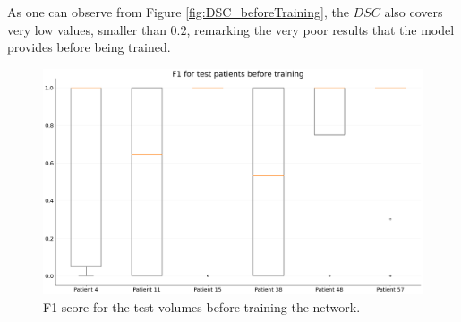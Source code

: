 \documentclass[12pt]{extarticle}
\begin{document}
\noindent As one can observe from Figure \ref{fig:DSC_beforeTraining}, the $DSC$ also covers very low values, smaller than $0.2$, remarking the very poor results that the model provides before being trained.
\begin{figure}[h!]
\centering
\includegraphics[width = \textwidth]{F1_beforeTraining.png}
\caption{F1 score for the test volumes before training the network.}
\label{fig:F1_beforeTraining}
\end{figure}
\end{document}
